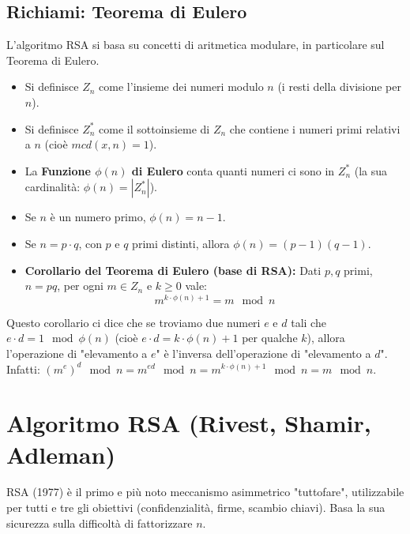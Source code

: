 \documentclass[../main.tex]{subfiles}
\begin{document}
\subsection{Richiami: Teorema di Eulero}
L'algoritmo RSA si basa su concetti di aritmetica modulare, in particolare sul Teorema di Eulero.
\begin{itemize}
    \item Si definisce $Z_n$ come l'insieme dei numeri modulo $n$ (i resti della divisione per $n$).
    \item Si definisce $Z_n^*$ come il sottoinsieme di $Z_n$ che contiene i numeri primi relativi a $n$ (cioè $mcd(x,n)=1$).
    \item La \textbf{Funzione $\phi(n)$ di Eulero} conta quanti numeri ci sono in $Z_n^*$ (la sua cardinalità: $\phi(n) = |Z_n^*|$).
    \item Se $n$ è un numero primo, $\phi(n) = n-1$.
    \item Se $n = p \cdot q$, con $p$ e $q$ primi distinti, allora $\phi(n) = (p-1)(q-1)$.
    \item \textbf{Corollario del Teorema di Eulero (base di RSA):} Dati $p, q$ primi, $n=pq$, per ogni $m \in Z_n$ e $k \ge 0$ vale:
    $$ m^{k \cdot \phi(n) + 1} = m \mod n $$
\end{itemize}
Questo corollario ci dice che se troviamo due numeri $e$ e $d$ tali che $e \cdot d = 1 \mod \phi(n)$ (cioè $e \cdot d = k \cdot \phi(n) + 1$ per qualche $k$), allora l'operazione di "elevamento a $e$" è l'inversa dell'operazione di "elevamento a $d$".
Infatti: $(m^e)^d \mod n = m^{ed} \mod n = m^{k \cdot \phi(n) + 1} \mod n = m \mod n$.

\section{Algoritmo RSA (Rivest, Shamir, Adleman)}
RSA (1977) è il primo e più noto meccanismo asimmetrico "tuttofare", utilizzabile per tutti e tre gli obiettivi (confidenzialità, firme, scambio chiavi). Basa la sua sicurezza sulla difficoltà di fattorizzare $n$.
\end{document}
